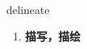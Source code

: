 
\begin{frame}
{\huge delineate}
\begin{center}
\begin{enumerate}\Large
  \item \textbf{描写，描绘}
\end{enumerate}
\end{center}
\end{frame}
